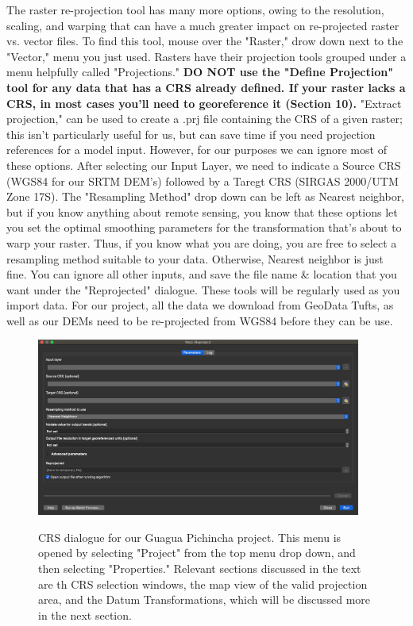 \documentclass{article}
\begin{document}
The raster re-projection tool has many more options, owing to the resolution, scaling, and warping that can have a much greater impact on re-projected raster vs. vector files. To find this tool, mouse over the "Raster," drow down next to the "Vector," menu you just used. Rasters have their projection tools grouped under a menu helpfully called "Projections." \textbf{DO NOT use the "Define Projection" tool for any data that has a CRS already defined. If your raster lacks a CRS, in most cases you'll need to georeference it (Section 10).} "Extract projection," can be used to create a .prj file containing the CRS of a given raster; this isn't particularly useful for us, but can save time if you need projection references for a model input. However, for our purposes we can ignore most of these options. After selecting our Input Layer, we need to indicate a Source CRS (WGS84 for our SRTM DEM's) followed by a Taregt CRS (SIRGAS 2000/UTM Zone 17S). The "Resampling Method" drop down can be left as Nearest neighbor, but if you know anything about remote sensing, you know that these options let you set the optimal smoothing parameters for the transformation that's about to warp your raster. Thus, if you know what you are doing, you are free to select a resampling method suitable to your data. Otherwise, Nearest neighbor is just fine. You can ignore all other inputs, and save the file name \& location that you want under the "Reprojected" dialogue. These tools will be regularly used as you import data. For our project, all the data we download from GeoData \@ Tufts, as well as our DEMs need to be re-projected from WGS84 before they can be use. 

\begin{figure}[htbp]
    \centering
    \includegraphics[width=0.95\textwidth]{Fig_17_reproj_raster.png}
    \label{fig13}
    \caption{CRS dialogue for our Guagua Pichincha project. This menu is opened by selecting "Project" from the top menu drop down, and then selecting "Properties." Relevant sections discussed in the text are th CRS selection windows, the map view of the valid projection area, and the Datum Transformations, which will be discussed more in the next section.}
\end{figure}
\end{document}
